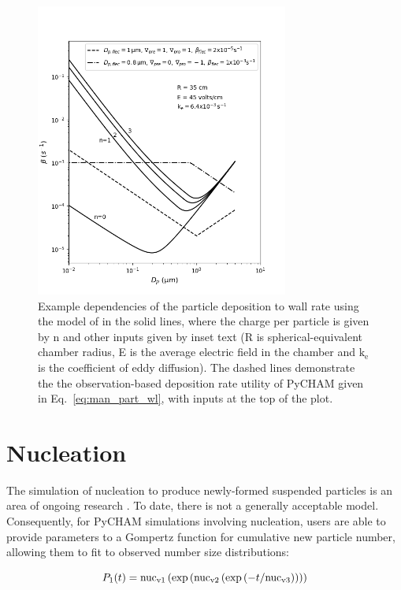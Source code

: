 \documentclass[gmd, manuscript]{copernicus}
\begin{document}
\begin{figure}[t]
\includegraphics[width=8.3cm]{Results/part_wall_depo_plot.png}
\caption{Example dependencies of the particle deposition to wall rate using the model of \citet{McMurry1985} in the solid lines, where the charge per particle is given by n and other inputs given by inset text (R is spherical-equivalent chamber radius, E is the average electric field in the chamber and $\mathrm{k_e}$ is the coefficient of eddy diffusion).  The dashed lines demonstrate the the observation-based deposition rate utility of PyCHAM given in Eq.~\ref{eq:man_part_wl}, with inputs at the top of the plot.}
\label{fig:part_wall_depo_plot}
\end{figure}

\section{Nucleation}\label{sec:nuc}

The simulation of nucleation to produce newly-formed suspended particles is an area of ongoing research \citep[e.g.][]{Kurten2018, Semeniuk2018, Li2020}.  To date, there is not a generally acceptable model.  Consequently, for PyCHAM simulations involving nucleation, users are able to provide parameters to a Gompertz function for cumulative new particle number, allowing them to fit to observed number size distributions:

\begin{equation} \label{eq:Gompertz}
P_{1}(t) = \rm{nuc_{v1}}\left(\exp \left(\rm{nuc_{v2}}\left(\exp \left(\mit{-t}/\rm{nuc_{v3}} \right) \right) \right) \right)
\end{equation}
\end{document}
